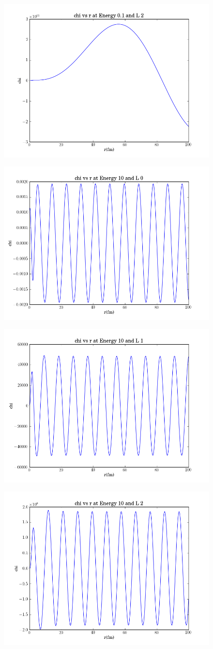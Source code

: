 \documentclass[11pt]{article} %
\begin{document}
\vspace{1mm}
\begin{figure}[H]
\centering
\includegraphics[width=.5\linewidth]{"chiE1L2"}
\end{figure}
\vspace{1mm}


\vspace{1mm}
\begin{figure}[H]
\centering
\includegraphics[width=.5\linewidth]{"chiE10L0"}
\end{figure}
\vspace{1mm}


\vspace{1mm}
\begin{figure}[H]
\centering
\includegraphics[width=.5\linewidth]{"chiE10L1"}
\end{figure}
\vspace{1mm}


\vspace{1mm}
\begin{figure}[H]
\centering
\includegraphics[width=.5\linewidth]{"chiE10L2"}
\end{figure}
\vspace{1mm}
\end{document}
